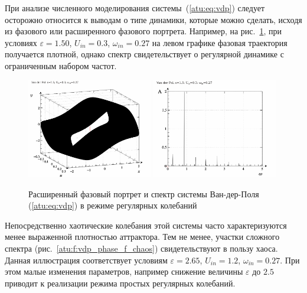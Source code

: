 При анализе численного моделирования системы~(\ref{atu:eq:vdp})
следует осторожно относится к выводам о типе динамики,
которые можно сделать, исходя из фазового или расширенного фазового портрета.
Например, на рис.~\ref{atu:f:vdp_phase_f_reg},
при условиях
$ \varepsilon=1.50$, $U_{in}=0.3$, $\omega_{in}=0.27$
на левом графике
фазовая траектория получается плотной,
однако спектр свидетельствует о регулярной динамике
с ограниченным набором частот.

\begin{figure}[ht!]
\begin{center}
  \includegraphics[width=0.49\textwidth]{p/cha/vdp/vdp_0-p_ph2d_1x50_0x30_0x27.png}
  \hfill
  \includegraphics[width=0.49\textwidth]{p/cha/vdp/vdp_fft-p_f_1x50_0x30_0x27.png}
\end{center}
  \caption{Расширенный фазовый портрет и спектр системы Ван-дер-Поля (\ref{atu:eq:vdp}) в режиме регулярных колебаний}
\label{atu:f:vdp_phase_f_reg}
\end{figure}

Непосредственно хаотические колебания этой системы часто характеризуются
менее выраженной плотностью аттрактора. Тем не менее,
участки сложного спектра (рис.~\ref{atu:f:vdp_phase_f_chaos})
свидетельствуют в пользу хаоса.
Данная иллюстрация соответствует условиям
$ \varepsilon=2.65$, $U_{in}=1.2$, $\omega_{in}=0.27$.
При этом малые изменения параметров, например
снижение величины $\varepsilon$ до $2.5$
приводит к реализации режима простых регулярных колебаний.

